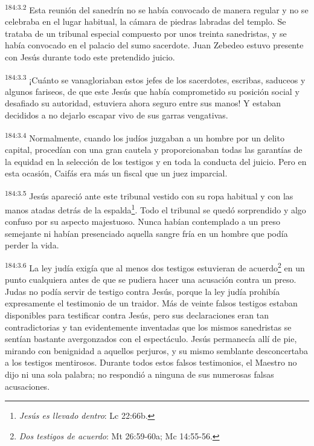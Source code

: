 \par 
\textsuperscript{184:3.2} Esta reunión del sanedrín no se había convocado de manera regular y no se celebraba en el lugar habitual, la cámara de piedras labradas del templo. Se trataba de un tribunal especial compuesto por unos treinta sanedristas, y se había convocado en el palacio del sumo sacerdote. Juan Zebedeo estuvo presente con Jesús durante todo este pretendido juicio.

\par 
\textsuperscript{184:3.3} ¡Cuánto se vanagloriaban estos jefes de los sacerdotes, escribas, saduceos y algunos fariseos, de que este Jesús que había comprometido su posición social y desafiado su autoridad, estuviera ahora seguro entre sus manos! Y estaban decididos a no dejarlo escapar vivo de sus garras vengativas.

\par 
\textsuperscript{184:3.4} Normalmente, cuando los judíos juzgaban a un hombre por un delito capital, procedían con una gran cautela y proporcionaban todas las garantías de la equidad en la selección de los testigos y en toda la conducta del juicio. Pero en esta ocasión, Caifás era más un fiscal que un juez imparcial.

\par 
\textsuperscript{184:3.5} Jesús apareció ante este tribunal vestido con su ropa habitual y con las manos atadas detrás de la espalda\footnote{\textit{Jesús es llevado dentro}: Lc 22:66b.}. Todo el tribunal se quedó sorprendido y algo confuso por su aspecto majestuoso. Nunca habían contemplado a un preso semejante ni habían presenciado aquella sangre fría en un hombre que podía perder la vida.

\par 
\textsuperscript{184:3.6} La ley judía exigía que al menos dos testigos estuvieran de acuerdo\footnote{\textit{Dos testigos de acuerdo}: Mt 26:59-60a; Mc 14:55-56.} en un punto cualquiera antes de que se pudiera hacer una acusación contra un preso. Judas no podía servir de testigo contra Jesús, porque la ley judía prohibía expresamente el testimonio de un traidor. Más de veinte falsos testigos estaban disponibles para testificar contra Jesús, pero sus declaraciones eran tan contradictorias y tan evidentemente inventadas que los mismos sanedristas se sentían bastante avergonzados con el espectáculo. Jesús permanecía allí de pie, mirando con benignidad a aquellos perjuros, y su mismo semblante desconcertaba a los testigos mentirosos. Durante todos estos falsos testimonios, el Maestro no dijo ni una sola palabra; no respondió a ninguna de sus numerosas falsas acusaciones.

